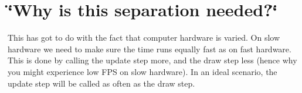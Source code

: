 \hypertarget{group__why__step}{\section{\char`\"{}\+Why is this separation needed?\char`\"{}}
\label{group__why__step}
}
This has got to do with the fact that computer hardware is varied. On slow hardware we need to make sure the time runs equally fast as on fast hardware. This is done by calling the update step more, and the draw step less (hence why you might experience low F\+P\+S on slow hardware). In an ideal scenario, the update step will be called as often as the draw step. 